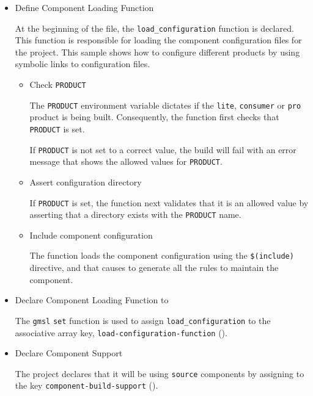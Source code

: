 \begin{itemize}
\item{Define Component Loading Function}

  At the beginning of the file, the \texttt{load\_configuration}
  function is declared.  This function is responsible for loading the
  component configuration files for the project.  This sample shows
  how to configure different products by using symbolic links to
  configuration files.

  \begin{itemize}
  \item{Check \texttt{PRODUCT}}

    The \texttt{PRODUCT} environment variable dictates if the
    \texttt{lite}, \texttt{consumer} or \texttt{pro} product is being
    built.  Consequently, the function first checks that
    \texttt{PRODUCT} is set.

    If \texttt{PRODUCT} is not set to a correct value, the build will
    fail with an error message that shows the allowed values for
    \texttt{PRODUCT}.

  \item{Assert configuration directory}

    If  \texttt{PRODUCT} is set, the function next validates that it
    is an allowed value by asserting that a directory exists with the
    \texttt{PRODUCT} name.

  \item{Include component configuration}

    The function loads the component configuration using the
    \texttt{\$(include)} directive, and that causes \lmsbw to generate
    all the rules to maintain the component.

  \end{itemize}

  \item{Declare Component Loading Function to \lmsbw}

    The \texttt{gmsl} \texttt{set} function is used to assign
    \texttt{load\_configuration} to the associative array key,
    \texttt{load-configuration-function}
    ().

  \item{Declare Component Support}

    The project declares that it will be using \texttt{source}
    components by assigning to the key \texttt{component-build-support}
    ().
\end{itemize}

